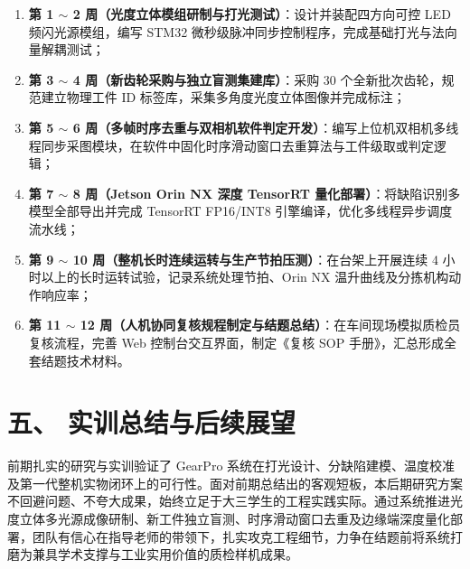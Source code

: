 \begin{enumerate}
    \item \textbf{第 1 $\sim$ 2 周（光度立体模组研制与打光测试）}：设计并装配四方向可控 LED 频闪光源模组，编写 STM32 微秒级脉冲同步控制程序，完成基础打光与法向量解耦测试；
    \item \textbf{第 3 $\sim$ 4 周（新齿轮采购与独立盲测集建库）}：采购 30 个全新批次齿轮，规范建立物理工件 ID 标签库，采集多角度光度立体图像并完成标注；
    \item \textbf{第 5 $\sim$ 6 周（多帧时序去重与双相机软件判定开发）}：编写上位机双相机多线程同步采图模块，在软件中固化时序滑动窗口去重算法与工件级取或判定逻辑；
    \item \textbf{第 7 $\sim$ 8 周（Jetson Orin NX 深度 TensorRT 量化部署）}：将缺陷识别多模型全部导出并完成 TensorRT FP16/INT8 引擎编译，优化多线程异步调度流水线；
    \item \textbf{第 9 $\sim$ 10 周（整机长时连续运转与生产节拍压测）}：在台架上开展连续 4 小时以上的长时运转试验，记录系统处理节拍、Orin NX 温升曲线及分拣机构动作响应率；
    \item \textbf{第 11 $\sim$ 12 周（人机协同复核规程制定与结题总结）}：在车间现场模拟质检员复核流程，完善 Web 控制台交互界面，制定《复核 SOP 手册》，汇总形成全套结题技术材料。
\end{enumerate}

\section*{五、 实训总结与后续展望}

前期扎实的研究与实训验证了 GearPro 系统在打光设计、分缺陷建模、温度校准及第一代整机实物闭环上的可行性。面对前期总结出的客观短板，本后期研究方案不回避问题、不夸大成果，始终立足于大三学生的工程实践实际。通过系统推进光度立体多光源成像研制、新工件独立盲测、时序滑动窗口去重及边缘端深度量化部署，团队有信心在指导老师的带领下，扎实攻克工程细节，力争在结题前将系统打磨为兼具学术支撑与工业实用价值的质检样机成果。
